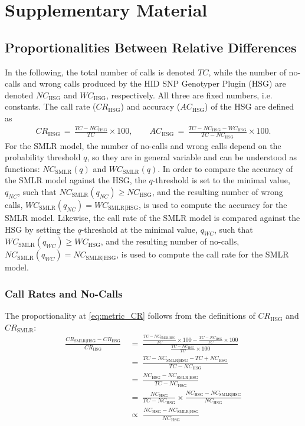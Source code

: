 \documentclass[preprint,5p,times,11pt]{elsarticle}
\begin{document}
\section*{Supplementary Material}

\subsection*{Proportionalities Between Relative Differences}
In the following, the total number of calls is denoted $TC$, while the number of no-calls and wrong calls produced by the HID SNP Genotyper Plugin (HSG) are denoted $NC_{\text{HSG}}$ and $WC_{\text{HSG}}$, respectively.
All three are fixed numbers, i.e. constants.
The call rate ($CR_{\text{HSG}}$) and accuracy ($AC_{\text{HSG}}$) of the HSG are defined as
\begin{align*}
CR_{\text{HSG}} \, = \, \frac{TC - NC_{\text{HSG}}}{TC} \times 100, \qquad
AC_{\text{HSG}} \, = \, \frac{TC - NC_{\text{HSG}} - WC_{\text{HSG}}}{TC - NC_{\text{HSG}}} \times 100.
\end{align*}
For the SMLR model, the number of no-calls and wrong calls depend on the probability threshold $q$, so they are in general variable and can be understood as functions: $NC_{\text{SMLR}}(q)$ and $WC_{\text{SMLR}}(q)$.
In order to compare the accuracy of the SMLR model against the HSG, the $q$-threshold is set to the minimal value, $q_{NC}$, such that $NC_{\text{SMLR}}(q_{NC}) \geq NC_{\text{HSG}}$, and the resulting number of wrong calls, $WC_{\text{SMLR}}(q_{NC}) = WC_{\text{SMLR}\mid\text{HSG}}$, is used to compute the accuracy for the SMLR model.
Likewise, the call rate of the SMLR model is compared against the HSG by setting the $q$-threshold at the minimal value, $q_{WC}$, such that $WC_{\text{SMLR}}(q_{WC}) \geq WC_{\text{HSG}}$, and the resulting number of no-calls, $NC_{\text{SMLR}}(q_{WC}) = NC_{\text{SMLR}\mid\text{HSG}}$, is used to compute the call rate for the SMLR model.

\subsubsection*{Call Rates and No-Calls}
The proportionality at \eqref{eq:metric_CR} follows from the definitions of $CR_{\text{HSG}}$ and $CR_{\text{SMLR}}$:
\begin{align*}
\frac{CR_{\text{SMLR}\mid\text{HSG}} - CR_{\text{HSG}}}{CR_{\text{HSG}}}
\ &= \ 
\frac{\frac{TC - NC_{\text{SMLR}\mid\text{HSG}}}{TC} \times 100 - \frac{TC - NC_{\text{HSG}}}{TC} \times 100}{\frac{TC - NC_{\text{HSG}}}{TC} \times 100} \\
&= \ 
\frac{TC - NC_{\text{SMLR}\mid\text{HSG}} - TC + NC_{\text{HSG}}}{TC - NC_{\text{HSG}}} \\
&= \ 
\frac{NC_{\text{HSG}} - NC_{\text{SMLR}\mid\text{HSG}}}{TC - NC_{\text{HSG}}} \\
&= \ 
\frac{NC_{\text{HSG}}}{TC - NC_{\text{HSG}}} \times \frac{NC_{\text{HSG}} - NC_{\text{SMLR}\mid\text{HSG}}}{NC_{\text{HSG}}} \\
\; &\propto \; 
\frac{NC_{\text{HSG}} - NC_{\text{SMLR}\mid\text{HSG}}}{NC_{\text{HSG}}}
\end{align*}
\end{document}
